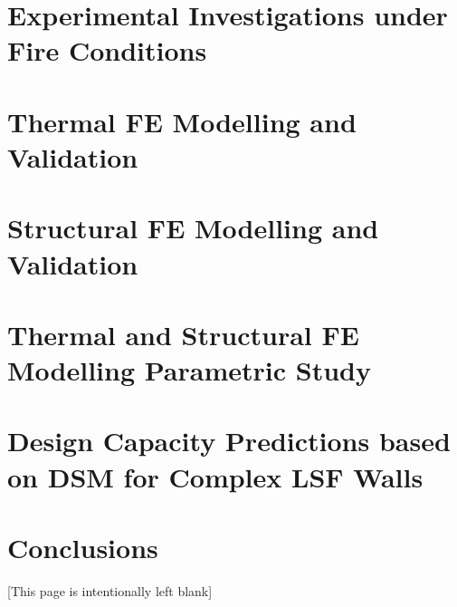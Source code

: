 \documentclass[twoside,openright,12pt]{book}
\makeatletter
\newcounter{savepage}
\def\cleardoublepage{\clearpage%
	\if@twoside
	\ifodd\c@page\else
	\vspace*{\fill}
	\hfill
	\begin{center}
		[This page is intentionally left blank]
	\end{center}
	\vspace{\fill}
	\thispagestyle{empty}
	\newpage
	\if@twocolumn\hbox{}\newpage\fi
	\fi
	\fi
}
\makeatother
\begin{document}
\chapter{Experimental Investigations under Fire Conditions}
\label{ch:Fire}       
 

\chapter{Thermal FE Modelling and Validation}
\label{ch:FE-Thermal}       
 

\chapter{Structural FE Modelling and Validation}
\label{ch:FE-Structural}       


\chapter{Thermal and Structural FE Modelling Parametric Study}
\label{ch:FE-Parametric}       


\chapter{Design Capacity Predictions based on DSM for Complex LSF Walls}
\label{ch:Design}       


\chapter{Conclusions}
\label{ch:Conclusions}       


\cleardoublepage

\setcounter{page}{\thesavepage}
\printbibliography[heading=bibintoc]
% 
% 

\end{document}
